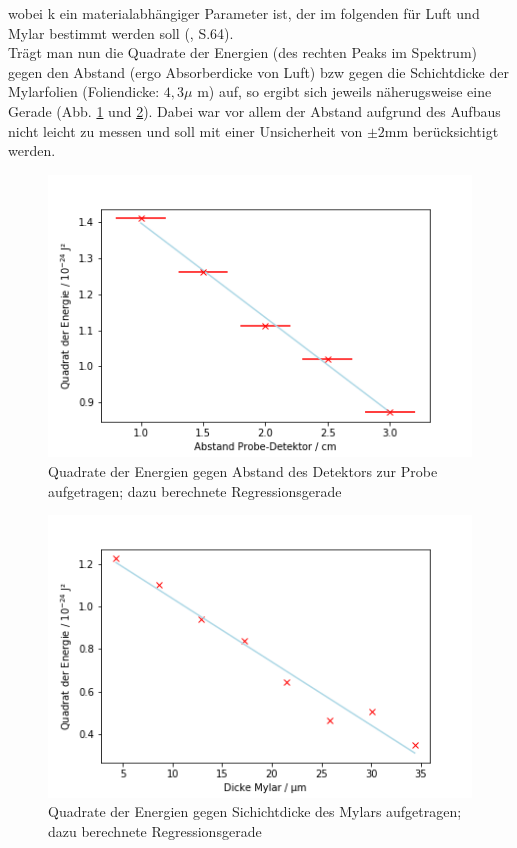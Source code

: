wobei k ein materialabhängiger Parameter ist, der im folgenden für Luft und Mylar bestimmt werden soll (\cite{Jaekel1997}, S.64).\\

Trägt man nun die Quadrate der Energien (des rechten Peaks im Spektrum) gegen den Abstand (ergo Absorberdicke von Luft) bzw 
gegen die Schichtdicke der Mylarfolien (Foliendicke: $4,3 \mu$ m) auf, so ergibt sich jeweils näherugsweise eine Gerade (Abb. \ref{bild:luftger} 
und \ref{bild:mylarger}). Dabei war vor allem der Abstand aufgrund des Aufbaus nicht leicht zu messen und soll mit einer Unsicherheit 
von $\pm 2$mm berücksichtigt werden.\\

\begin{figure}[h]
    \captionsetup{justification=centering,margin=2cm}
    \centering
    \includegraphics[scale=0.75]{Bilder/luftger.png}
    \caption{Quadrate der Energien gegen Abstand des Detektors zur Probe aufgetragen; dazu berechnete Regressionsgerade}
    \label{bild:luftger}
\end{figure}

\begin{figure}[h]
    \captionsetup{justification=centering,margin=2cm}
    \centering
    \includegraphics[scale=0.75]{Bilder/mylarger.png}
    \caption{Quadrate der Energien gegen Sichichtdicke des Mylars aufgetragen; dazu berechnete Regressionsgerade}
    \label{bild:mylarger}
\end{figure}


